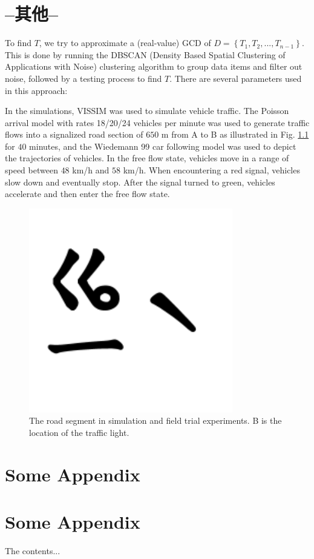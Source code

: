 \documentclass[final,oneside,onecolumn,12pt,a4paper]{book}%
\begin{document}
\chapter{--其他--}
To find $T$, we try to approximate a (real-value) GCD of $D=\left\{
T_{1},T_{2},...,T_{n-1}\right\}  $. This is done by running the DBSCAN
(Density Based Spatial Clustering of Applications with Noise) clustering
algorithm \cite{Ester1996DBSCAN} to group data items and filter out noise,
followed by a testing process to find $T$. There are several parameters used
in this approach:

In the simulations, VISSIM \cite{Mosseri2004VISSIM} was used to simulate
vehicle traffic. The Poisson arrival model with rates 18/20/24 vehicles per
minute was used to generate traffic flows into a signalized road section of
$650$ m from A to B as illustrated in Fig. \ref{fig:f_map} for $40$ minutes,
and the Wiedemann 99 car following model \cite{Mosseri2004VISSIM} was used to
depict the trajectories of vehicles. In the free flow state, vehicles move in
a range of speed between $48$ km/h and $58$ km/h. When encountering a red
signal, vehicles slow down and eventually stop. After the signal turned to
green, vehicles accelerate and then enter the free flow state.
\begin{figure}[pth]
\centerline{\includegraphics[angle=0, width=3.5in,keepaspectratio,clip]
{圖/⿳⿳ㆣㄧˋ}} \hfill\caption{The road segment in simulation and field
trial experiments. B is the location of the traffic light.}%
\label{fig:f_map}%
\end{figure}




\begin{appendices}
\chapter{Some Appendix}
\chapter{Some Appendix}
The contents...
\end{appendices}
\end{document}
